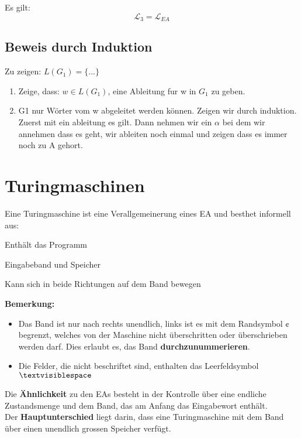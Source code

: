 \documentclass[11pt]{article}
\begin{document}
Es gilt:
\begin{equation*}
	\mathcal{L}_3 = \mathcal{L}_{EA}
\end{equation*}

\subsection{Beweis durch Induktion}

Zu zeigen: $L(G_1) = \{...\}$
\begin{enumerate}
	\item Zeige, dass: $w \in L(G_1)$, eine Ableitung fur w in $G_1$ zu geben.
	\item G1 nur Wörter vom w abgeleitet werden können. Zeigen wir durch induktion. Zuerst mit ein ableitung es gilt. Dann nehmen wir ein $\alpha$ bei dem wir annehmen dass es geht, wir ableiten noch einmal und zeigen dass es immer noch zu A gehort.
\end{enumerate}

\section{Turingmaschinen}

Eine Turingmaschine ist eine Verallgemeinerung eines EA und besthet informell aus:
\begin{description}[labelindent=16pt,style=multiline,leftmargin=4.5cm, noitemsep]
	\item[Kontrolle:] Enth{\"a}lt das Programm
	\item[Unendliches Band:] Eingabeband und Speicher
	\item[Lese-/Schreibkopf:] Kann sich in beide Richtungen auf dem Band bewegen
\end{description}

\textbf{Bemerkung:} \begin{itemize}
	\item Das Band ist nur nach rechts unendlich, links ist es mit dem Randsymbol $\cent$ begrenzt, welches von der Maschine nicht {\"u}berschritten oder {\"u}berschrieben werden darf. Dies erlaubt es, das Band \textbf{durchzunummerieren}.
	\item Die Felder, die nicht beschriftet sind, enthalten das Leerfeldsymbol $\textvisiblespace$
\end{itemize}

Die \textbf{{\"A}hnlichkeit} zu den EAs besteht in der Kontrolle {\"u}ber eine endliche Zustandsmenge und dem Band, das am Anfang das Eingabewort enth{\"a}lt. \\
Der \textbf{Hauptunterschied} liegt darin, dass eine Turingmaschine mit dem Band {\"u}ber einen unendlich grossen Speicher verf{\"u}gt. \\
\end{document}
